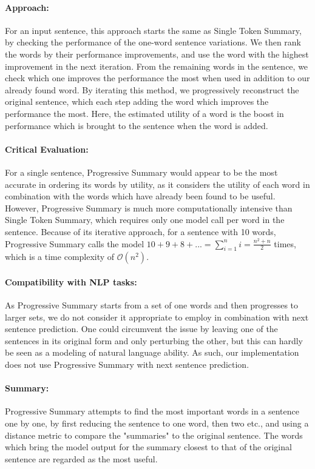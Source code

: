 \paragraph{Approach:}
For an input sentence, this approach starts the same as Single Token Summary, by checking the performance of the one-word sentence variations.
We then rank the words by their performance improvements, and use the word with the highest improvement in the next iteration.
From the remaining words in the sentence, we check which one improves the performance the most when used in addition to our already found word.
By iterating this method, we progressively reconstruct the original sentence, which each step adding the word which improves the performance the most.
Here, the estimated utility of a word is the boost in performance which is brought to the sentence when the word is added.

\paragraph{Critical Evaluation:}
For a single sentence, Progressive Summary would appear to be the most accurate in ordering its words by utility, as it considers the utility of each word in combination with the words which have already been found to be useful.
However, Progressive Summary is much more computationally intensive than Single Token Summary, which requires only one model call per word in the sentence.
Because of its iterative approach, for a sentence with 10 words, Progressive Summary calls the model $10+9+8+... = \sum_{i=1}^{n}i = \frac{n^2 + n}{2}$ times, which is a time complexity of $\mathcal{O}(n^2)$.

\paragraph{Compatibility with NLP tasks:}
As Progressive Summary starts from a set of one words and then progresses to larger sets, we do not consider it appropriate to employ in combination with next sentence prediction.
One could circumvent the issue by leaving one of the sentences in its original form and only perturbing the other, but this can hardly be seen as a modeling of natural language ability.
As such, our implementation does not use Progressive Summary with next sentence prediction.

\paragraph{Summary:}
Progressive Summary attempts to find the most important words in a sentence one by one, by first reducing the sentence to one word, then two etc., and using a distance metric to compare the "summaries" to the original sentence.
The words which bring the model output for the summary closest to that of the original sentence are regarded as the most useful.

